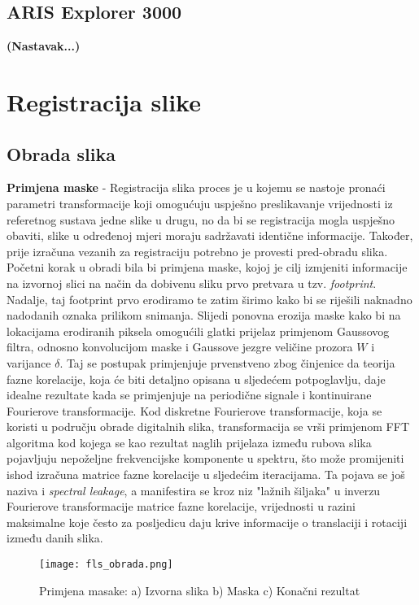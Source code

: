 \documentclass[times, utf8, diplomski]{fer}
\begin{document}
\section{ARIS Explorer 3000}
\textbf{(Nastavak...)}
\chapter{Registracija slike}
\section{Obrada slika}
\textbf{Primjena maske} - Registracija slika proces je u kojemu se nastoje pronaći parametri transformacije koji omogućuju uspješno preslikavanje vrijednosti iz referetnog sustava jedne slike u drugu, no da bi se registracija mogla uspješno obaviti, slike u određenoj mjeri moraju sadržavati identične informacije. Također, prije izračuna vezanih za registraciju potrebno je provesti pred-obradu slika. Početni korak u obradi bila bi primjena maske, kojoj je cilj izmjeniti informacije na izvornoj slici na način da dobivenu sliku prvo pretvara u tzv. \textit{footprint}. Nadalje, taj footprint prvo erodiramo te zatim širimo kako bi se riješili naknadno nadodanih oznaka prilikom snimanja. Slijedi ponovna erozija maske kako bi na lokacijama erodiranih piksela omogućili glatki prijelaz primjenom Gaussovog filtra, odnosno konvolucijom maske i Gaussove jezgre veličine prozora $W$ i varijance $\delta$. Taj se postupak primjenjuje prvenstveno zbog činjenice da teorija fazne korelacije, koja će biti detaljno opisana u sljedećem potpoglavlju, daje idealne rezultate kada se primjenjuje na periodične signale i kontinuirane Fourierove transformacije. Kod diskretne Fourierove transformacije, koja se koristi u području obrade digitalnih slika, transformacija se vrši primjenom FFT algoritma kod kojega se kao rezultat naglih prijelaza između rubova slika pojavljuju nepoželjne frekvencijske komponente u spektru, što može promijeniti ishod izračuna matrice fazne korelacije u sljedećim iteracijama. Ta pojava se još naziva i \textit{spectral leakage}, a manifestira se kroz niz "lažnih šiljaka" u inverzu Fourierove transformacije matrice fazne korelacije, vrijednosti u razini maksimalne koje često za posljedicu daju krive informacije o translaciji i rotaciji između danih slika. 

\begin{figure}[htb]
\centering
\texttt{[image: fls\_obrada.png]}
\caption{Primjena masake: a) Izvorna slika b) Maska c) Konačni rezultat}
\label{fig:Pred-obrada slika sonara}
\end{figure}
\end{document}
